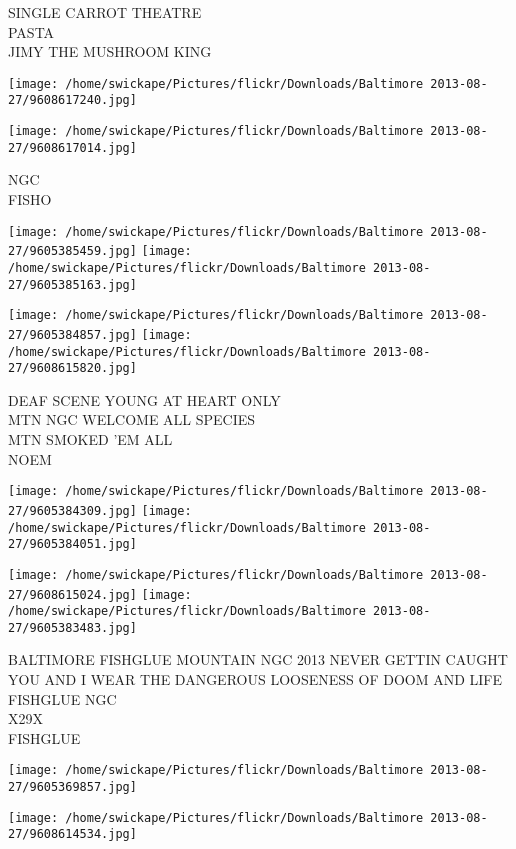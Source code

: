 \documentclass[10pt,letterpaper]{article}
\begin{document}
SINGLE CARROT THEATRE\\
PASTA\\
JIMY THE MUSHROOM KING
\pagebreak

\texttt{[image: /home/swickape/Pictures/flickr/Downloads/Baltimore 2013-08-27/9608617240.jpg]}

\vspace{0.25in}
\texttt{[image: /home/swickape/Pictures/flickr/Downloads/Baltimore 2013-08-27/9608617014.jpg]}

NGC\\
FISHO
\pagebreak

\texttt{[image: /home/swickape/Pictures/flickr/Downloads/Baltimore 2013-08-27/9605385459.jpg]}
\texttt{[image: /home/swickape/Pictures/flickr/Downloads/Baltimore 2013-08-27/9605385163.jpg]}

\texttt{[image: /home/swickape/Pictures/flickr/Downloads/Baltimore 2013-08-27/9605384857.jpg]}
\texttt{[image: /home/swickape/Pictures/flickr/Downloads/Baltimore 2013-08-27/9608615820.jpg]}

DEAF SCENE YOUNG AT HEART ONLY\\
MTN NGC WELCOME ALL SPECIES\\
MTN SMOKED 'EM ALL\\
NOEM
\pagebreak

\texttt{[image: /home/swickape/Pictures/flickr/Downloads/Baltimore 2013-08-27/9605384309.jpg]}
\texttt{[image: /home/swickape/Pictures/flickr/Downloads/Baltimore 2013-08-27/9605384051.jpg]}

\texttt{[image: /home/swickape/Pictures/flickr/Downloads/Baltimore 2013-08-27/9608615024.jpg]}
\texttt{[image: /home/swickape/Pictures/flickr/Downloads/Baltimore 2013-08-27/9605383483.jpg]}

BALTIMORE FISHGLUE MOUNTAIN NGC 2013 NEVER GETTIN CAUGHT\\
YOU AND I WEAR THE DANGEROUS LOOSENESS OF DOOM AND LIFE FISHGLUE NGC\\
X29X\\
FISHGLUE
\pagebreak

\texttt{[image: /home/swickape/Pictures/flickr/Downloads/Baltimore 2013-08-27/9605369857.jpg]}

\vspace{0.25in}
\texttt{[image: /home/swickape/Pictures/flickr/Downloads/Baltimore 2013-08-27/9608614534.jpg]}
\end{document}

